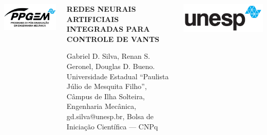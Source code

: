 \documentclass[serif,20pt]{beamer}
\begin{document}
\begin{frame}[t]
\vspace{5cm}
\begin{columns}
\includegraphics[width=\columnwidth]{ppgem.png}
\begin{center}\Large{%
    \bfseries \MakeUppercase{Redes Neurais Artificiais Integradas para Controle de VANTs}}

    \small{Gabriel D. Silva, Renan S. Geronel, Douglas D. Bueno. Universidade Estadual ``Paulista Júlio de Mesquita Filho'', Câmpus de Ilha Solteira, Engenharia Mecânica, gd.silva@unesp.br, Bolsa de Iniciação Científica --- CNPq}
\end{center}
\includegraphics[width=\columnwidth]{unesp_logo.png}
\end{columns}

\vspace{5cm}


\end{frame}
\end{document}
